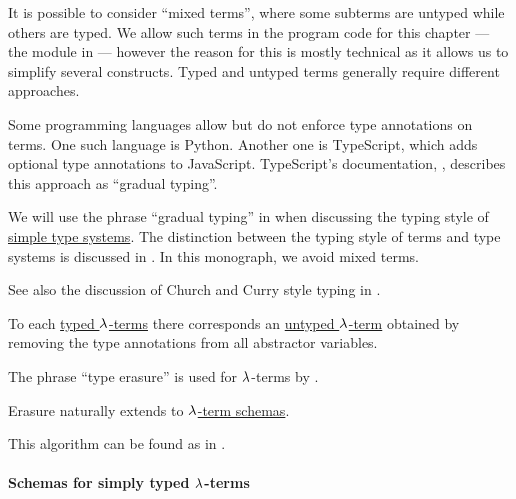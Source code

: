\begin{remark}\label{rem:gradually_typed_terms}
  It is possible to consider \enquote{mixed terms}, where some subterms are untyped while others are typed. We allow such terms in the program code for this chapter --- the module  in \cite{notebook:code} --- however the reason for this is mostly technical as it allows us to simplify several constructs. Typed and untyped terms generally require different approaches.

  Some programming languages allow but do not enforce type annotations on terms. One such language is Python. Another one is TypeScript, which adds optional type annotations to JavaScript. TypeScript's documentation, \cite{TypeScript:5.7:handbook}, describes this approach as \enquote{gradual typing}.

  We will use the phrase \enquote{gradual typing} in  when discussing the typing style of \hyperref[def:simple_type_system]{simple type systems}. The distinction between the typing style of terms and type systems is discussed in . In this monograph, we avoid mixed terms.

  See also the discussion of Church and Curry style typing in .
\end{remark}

\begin{algorithm}\label{alg:type_erasure}
  To each \hyperref[def:typed_lambda_term]{typed \( \mathrm{\lambda} \)-terms} there corresponds an \hyperref[def:lambda_term]{untyped \( \mathrm{\lambda} \)-term} obtained by removing the type annotations from all abstractor variables.
\end{algorithm}
\begin{comments}
  \item The phrase \enquote{type erasure} is used for \( \mathrm{\lambda} \)-terms by .
  \item Erasure naturally extends to \hyperref[def:simple_type_schema]{\( \mathrm{\lambda} \)-term schemas}.
  \item This algorithm can be found as  in \cite{notebook:code}.
\end{comments}

\paragraph{Schemas for simply typed \( \mathrm{\lambda} \)-terms}\hfill

